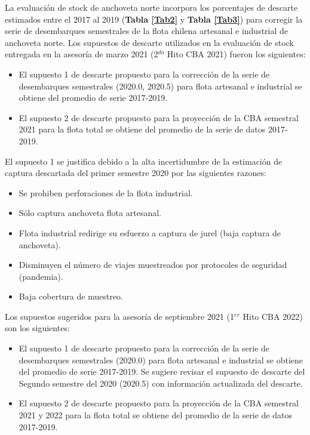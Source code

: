 \documentclass[letter,11pt]{article}
\begin{document}
\quad

La evaluaci\'on de stock de anchoveta norte incorpora los porcentajes de
descarte estimados entre el 2017 al 2019 (\textbf{Tabla \ref{Tab2}} y
\textbf{Tabla \ref{Tab3}}) para corregir la serie de desembarques
semestrales de la flota chilena artesanal e industrial de anchoveta
norte. Los supuestos de descarte utilizados en la evaluaci\'on de stock
entregada en la asesor\'ia de marzo 2021 (2$^{do}$ Hito CBA 2021) fueron los
siguientes:

\begin{itemize}
\item El supuesto 1 de descarte propuesto para la correcci\'on de la serie de desembarques semestrales (2020.0, 2020.5) para flota artesanal e industrial se obtiene del promedio de serie 2017-2019.
\item El supuesto 2 de descarte propuesto para la proyecci\'on de la CBA semestral 2021 para la flota total se obtiene del promedio de la serie de datos 2017-2019.
\end{itemize}

El supuesto 1 se justifica debido a la alta incertidumbre de la
estimaci\'on de captura descartada del primer semestre 2020 por las
siguientes razones:

\begin{itemize}
\item Se prohiben perforaciones de la flota industrial.
\item S\'olo captura anchoveta flota artesanal.
\item Flota industrial redirige su esfuerzo a captura de jurel (baja captura de anchoveta).
\item Disminuyen el n\'umero de viajes muestreados por protocoles de seguridad (pandemia).
\item Baja cobertura de muestreo.
\end{itemize}

Los supuestos sugeridos para la asesor\'ia de septiembre 2021 (1$^{er}$ Hito
CBA 2022) son los siguientes:

\begin{itemize}
\item El supuesto 1 de descarte propuesto para la correcci\'on de la serie de desembarques semestrales (2020.0) para flota artesanal e industrial se obtiene del promedio de serie 2017-2019. Se sugiere revisar el supuesto de descarte del Segundo semestre del 2020 (2020.5) con informaci\'on actualizada del descarte.
\item El supuesto 2 de descarte propuesto para la proyecci\'on de la CBA semestral 2021 y 2022 para la flota total se obtiene del promedio de la serie de datos 2017-2019.
\end{itemize}
\end{document}
